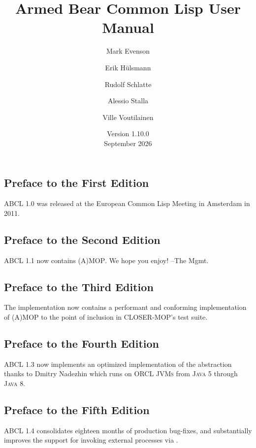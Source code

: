 \documentclass[10pt]{book}
\begin{document}
\title{Armed Bear Common Lisp User Manual}
\date{Version 1.10.0  \\
\smallskip
September 2026}
\author{Mark Evenson \and Erik H\"{u}lsmann \and Rudolf Schlatte \and
  Alessio Stalla \and Ville Voutilainen}

\maketitle

\tableofcontents

\subsection{Preface to the First Edition}
\textsc{ABCL} 1.0 was released at the European Common Lisp Meeting
in Amsterdam in 2011.

\subsection{Preface to the Second Edition}
\textsc{ABCL} 1.1 now contains \textsc{(A)MOP}.  We hope you enjoy!
--The Mgmt.

\subsection{Preface to the Third Edition}
The implementation now contains a performant and conforming
implementation of \textsc{(A)MOP} to the point of inclusion in
\textsc{CLOSER-MOP}'s test suite.

\subsection{Preface to the Fourth Edition}

\textsc{ABCL} 1.3 now implements an optimized implementation of the
 abstraction thanks to Dmitry
Nadezhin which runs on ORCL \textsc{JVMs} from \textsc{Java 5} through
\textsc{Java 8}.

\subsection{Preface to the Fifth Edition}

\textsc{ABCL} 1.4 consolidates eighteen months of production bug-fixes,
and substantially improves the support for invoking external
processes via .
\end{document}
